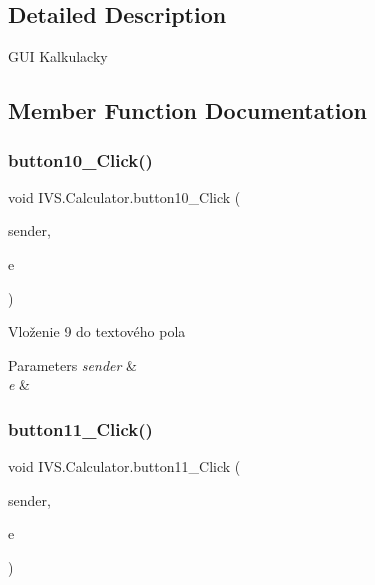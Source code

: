 

\subsection{Detailed Description}
G\+UI Kalkulacky 



\subsection{Member Function Documentation}
\mbox{\label{class_i_v_s_1_1_calculator_aa06324ed88e9004bf9cd91dd9195e146}} 
\subsubsection{\texorpdfstring{button10\+\_\+\+Click()}{button10\_Click()}}
{\footnotesize\ttfamily void I\+V\+S.\+Calculator.\+button10\+\_\+\+Click (\begin{DoxyParamCaption}\item[{object}]{sender,  }\item[{Event\+Args}]{e }\end{DoxyParamCaption})\hspace{0.3cm}{\ttfamily [protected]}}



Vloženie \textquotesingle{}9\textquotesingle{} do textového pola 


\begin{DoxyParams}{Parameters}
{\em sender} & \\
\hline
{\em e} & \\
\hline
\end{DoxyParams}
\mbox{\label{class_i_v_s_1_1_calculator_af183a6b7dd102cfeceb0bff1495e9a0e}} 
\subsubsection{\texorpdfstring{button11\+\_\+\+Click()}{button11\_Click()}}
{\footnotesize\ttfamily void I\+V\+S.\+Calculator.\+button11\+\_\+\+Click (\begin{DoxyParamCaption}\item[{object}]{sender,  }\item[{Event\+Args}]{e }\end{DoxyParamCaption})\hspace{0.3cm}{\ttfamily [protected]}}



